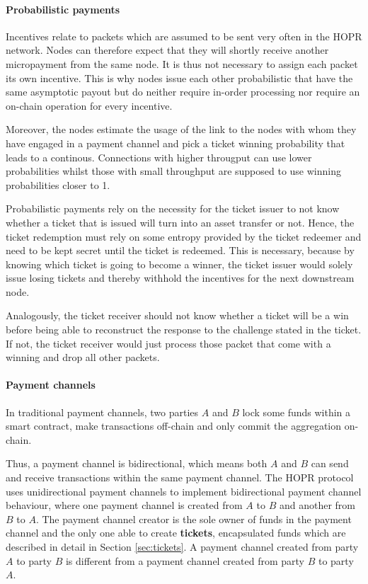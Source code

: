 \paragraph{Probabilistic payments}
\label{sec:incentives:probabilistic:probabilistic}

Incentives relate to packets which are assumed to be sent very often in the HOPR network. Nodes can therefore expect that they will shortly receive another micropayment from the same node. It is thus not necessary to assign each packet its own incentive. This is why nodes issue each other probabilistic  that have the same asymptotic payout but do neither require in-order processing nor require an on-chain operation for every incentive.

Moreover, the nodes estimate the usage of the link to the nodes with whom they have engaged in a payment channel and pick a ticket winning probability that leads to a continous. Connections with higher througput can use lower probabilities whilst those with small throughput are supposed to use winning probabilities closer to 1.

Probabilistic payments rely on the necessity for the ticket issuer to not know whether a ticket that is issued will turn into an asset transfer or not. Hence, the ticket redemption must rely on some entropy provided by the ticket redeemer and need to be kept secret until the ticket is redeemed. This is necessary, because by knowing which ticket is going to become a winner, the ticket issuer would solely issue losing tickets and thereby withhold the incentives for the next downstream node.

Analogously, the ticket receiver should not know whether a ticket will be a win before being able to reconstruct the response to the challenge stated in the ticket. If not, the ticket receiver would just process those packet that come with a winning and drop all other packets.

\paragraph{Payment channels}

In traditional payment channels, two parties $A$ and $B$ lock some funds within a smart contract, make transactions off-chain and only commit the aggregation on-chain.



Thus, a payment channel is bidirectional, which means both $A$ and $B$ can send and receive transactions within the same payment channel. The HOPR protocol uses unidirectional payment channels to implement bidirectional payment channel behaviour, where one payment channel is created from $A$ to $B$ and another from $B$ to $A$. The payment channel creator is the sole owner of funds in the payment channel and the only one able to create \textbf{tickets}, encapsulated funds which are described in detail in Section \ref{sec:tickets}. A payment channel created from party $A$ to party $B$ is different from a payment channel created from party $B$ to party $A$.

